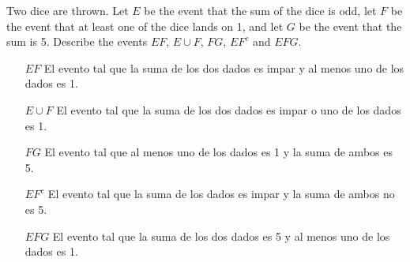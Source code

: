 \item Two dice are thrown. Let $E$ be the event that the sum of the dice is odd, let $F$ be the event that at least one of the dice lands on 1, and let $G$ be the event that the sum is 5. Describe the events $EF$, $E\cup F$, $FG$, $EF^c$ and $EFG$.

\begin{itemize}
    \item[$EF$] El evento tal que la suma de los dos dados es impar y al menos uno de los dados es 1.
    \item[$E\cup F$] El evento tal que la suma de los dos dados es impar o uno de los dados es 1.
    \item[$FG$] El evento tal que al menos uno de los dados es 1 y la suma de ambos es 5.
    \item[$EF^c$] El evento tal que la suma de los dados es impar y la suma de ambos no es 5.
    \item[$EFG$] El evento tal que la suma de los dos dados es 5 y al menos uno de los dados es 1.
\end{itemize}